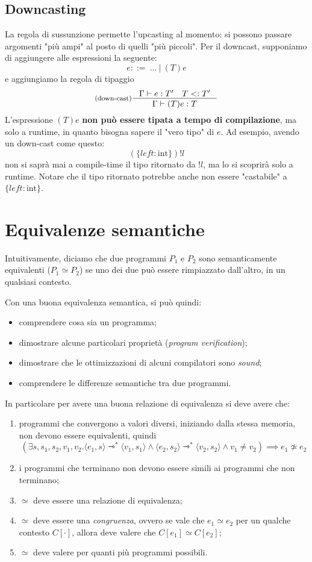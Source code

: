 \documentclass[a4paper, 11pt]{article}
\newcommand{\type}{\Gamma \vdash}
\newcommand{\goesto}{\rightarrowtriangle}
\begin{document}
\subsection{Downcasting}
La regola di sussunzione permette l'upcasting al momento: si possono passare argomenti "più ampi" al posto di quelli "più piccoli". Per il downcast, supponiamo di aggiungere alle espressioni la seguente:
\[
	e::=\ \dots\ |\ (T)e
\]
 e aggiungiamo la regola di tipaggio \[ \inference[(down-cast)]{\type e:T' \quad T<: T'}{\type (T)e:T } \]
 L'espressione $(T)e$ \textbf{non può essere tipata a tempo di compilazione}, ma solo a runtime, in quanto bisogna sapere il "vero tipo" di $e$. Ad esempio, avendo un down-cast come questo: \[ (\lbrace left:\text{int} \rbrace) !l\] non si saprà mai a compile-time il tipo ritornato da $!l$, ma lo si scoprirà solo a runtime. Notare che il tipo ritornato potrebbe anche non essere "castabile" a $\lbrace left:\text{int} \rbrace$.
\newpage

\section{Equivalenze semantiche}
Intuitivamente, diciamo che due programmi $P_1$ e $P_2$ sono semanticamente equivalenti ($P_1 \simeq P_2$) se uno dei due può essere rimpiazzato dall'altro, in un qualsiasi contesto.

Con una buona equivalenza semantica, si può quindi: \begin{itemize}
	\item comprendere cosa sia un programma;
	\item dimostrare alcune particolari proprietà (\textit{program verification});
	\item dimostrare che le ottimizzazioni di alcuni compilatori sono \textit{sound};
	\item comprendere le differenze semantiche tra due programmi.
\end{itemize}

In particolare per avere una buona relazione di equivalenza si deve avere che: \begin{enumerate}
	\item programmi che convergono a valori diversi, iniziando dalla stessa memoria, non devono essere equivalenti, quindi \[ (\exists s, s_1, s_2, v_1, v_2. \langle e_1, s \rangle \goesto^\ast \langle v_1, s_1 \rangle \wedge \langle e_2, s_2 \rangle \goesto^\ast \langle v_2, s_2 \rangle \wedge v_1 \neq v_2) \implies e_1 \nsimeq e_2 \]
	\item i programmi che terminano non devono essere simili ai programmi che non terminano;
	\item $\simeq$ deve essere una relazione di equivalenza;
	\item $\simeq$ deve essere una \textit{congruenza}, ovvero se vale che $e_1 \simeq e_2$ per un qualche contesto $C\left[ \cdot \right]$, allora deve valere che $C\left[e_1\right] \simeq C\left[e_2\right]$;
	\item $\simeq$ deve valere per quanti più programmi possibili.
\end{enumerate}
\end{document}
